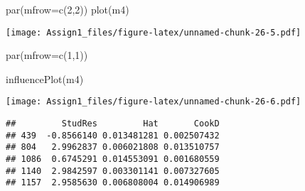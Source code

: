 \documentclass[
]{article}
\newenvironment{Shaded}{\begin{snugshade}}{\end{snugshade}}
\newcommand{\AttributeTok}[1]{\textcolor[rgb]{0.77,0.63,0.00}{#1}}
\newcommand{\DecValTok}[1]{\textcolor[rgb]{0.00,0.00,0.81}{#1}}
\newcommand{\FunctionTok}[1]{\textcolor[rgb]{0.00,0.00,0.00}{#1}}
\newcommand{\NormalTok}[1]{#1}
\begin{document}
\begin{Shaded}
\begin{Highlighting}[]
\FunctionTok{par}\NormalTok{(}\AttributeTok{mfrow=}\FunctionTok{c}\NormalTok{(}\DecValTok{2}\NormalTok{,}\DecValTok{2}\NormalTok{))}
\FunctionTok{plot}\NormalTok{(m4)}
\end{Highlighting}
\end{Shaded}

\texttt{[image: Assign1\_files/figure-latex/unnamed-chunk-26-5.pdf]}

\begin{Shaded}
\begin{Highlighting}[]
\FunctionTok{par}\NormalTok{(}\AttributeTok{mfrow=}\FunctionTok{c}\NormalTok{(}\DecValTok{1}\NormalTok{,}\DecValTok{1}\NormalTok{))}

\FunctionTok{influencePlot}\NormalTok{(m4)}
\end{Highlighting}
\end{Shaded}

\texttt{[image: Assign1\_files/figure-latex/unnamed-chunk-26-6.pdf]}

\begin{verbatim}
##         StudRes         Hat       CookD
## 439  -0.8566140 0.013481281 0.002507432
## 804   2.9962837 0.006021808 0.013510757
## 1086  0.6745291 0.014553091 0.001680559
## 1140  2.9842597 0.003301141 0.007327605
## 1157  2.9585630 0.006808004 0.014906989
\end{verbatim}
\end{document}
